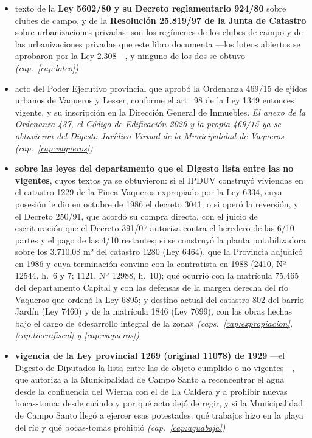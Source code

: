 \begin{itemize}[leftmargin=*]
\item texto de la \textbf{Ley 5602/80 y su Decreto reglamentario 924/80} sobre clubes de campo, y de la \textbf{Resolución 25.819/97 de la Junta de Catastro} sobre urbanizaciones privadas: son los regímenes de los clubes de campo y de las urbanizaciones privadas que este libro documenta ---los loteos abiertos se aprobaron por la Ley 2.308---, y ninguno de los dos se obtuvo \textit{(cap.\ \ref{cap:loteo})}
\item acto del Poder Ejecutivo provincial que aprobó la Ordenanza 469/15 de ejidos urbanos de Vaqueros y Lesser, conforme el art.\ 98 de la Ley 1349 entonces vigente, y su inscripción en la Dirección General de Inmuebles. \textit{El anexo de la Ordenanza 437, el Código de Edificación 2026 y la propia 469/15 ya se obtuvieron del Digesto Jurídico Virtual de la Municipalidad de Vaqueros} \textit{(cap.\ \ref{cap:vaqueros})}
\item \textbf{sobre las leyes del departamento que el Digesto lista entre las no vigentes}, cuyos textos ya se obtuvieron: si el IPDUV construyó viviendas en el catastro 1229 de la Finca Vaqueros expropiado por la Ley 6334, cuya posesión le dio en octubre de 1986 el decreto 3041, o si operó la reversión, y el Decreto 250/91, que acordó su compra directa, con el juicio de escrituración que el Decreto 391/07 autoriza contra el heredero de las 6/10 partes y el pago de las 4/10 restantes; si se construyó la planta potabilizadora sobre los 3.710,08 m² del catastro 1280 (Ley 6464), que la Provincia adjudicó en 1986 y cuya terminación convino con la contratista en 1988 (2410, Nº 12544, h.\ 6 y 7; 1121, Nº 12988, h.\ 10); qué ocurrió con la matrícula 75.465 del departamento Capital y con las defensas de la margen derecha del río Vaqueros que ordenó la Ley 6895; y destino actual del catastro 802 del barrio Jardín (Ley 7460) y de la matrícula 1846 (Ley 7699), con las obras hechas bajo el cargo de «desarrollo integral de la zona» \textit{(caps.\ \ref{cap:expropiacion}, \ref{cap:tierrafiscal} y \ref{cap:vaqueros})}
\item \textbf{vigencia de la Ley provincial 1269 (original 11078) de 1929} ---el Digesto de Diputados la lista entre las de objeto cumplido o no vigentes---, que autoriza a la Municipalidad de Campo Santo a reconcentrar el agua desde la confluencia del Wierna con el de La Caldera y a prohibir nuevas bocas-toma: desde cuándo y por qué acto dejó de regir, y si la Municipalidad de Campo Santo llegó a ejercer esas potestades: qué trabajos hizo en la playa del río y qué bocas-tomas prohibió \textit{(cap.\ \ref{cap:aguabaja})}

\end{itemize}
